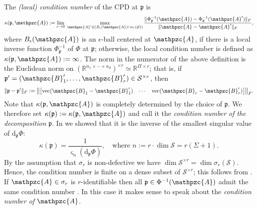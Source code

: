 \documentclass[a4paper,10pt,final]{siamart1116}
\newcommand{\tuple}[1]{\mathfrak{#1}}
\newcommand{\Var}[1]{\mathcal{#1}}
\newcommand{\tensor}[1]{\mathpzc{#1}}
\newcommand{\deriv}[2]{\mathrm{d}_{#1}#2}
\newcommand{\R}{\mathbb{R}}
\numberwithin{equation}{section}
\numberwithin{figure}{section}
\numberwithin{table}{section}
\numberwithin{theorem}{section}
\begin{document}
The \emph{(local) condition number} \cite{BC2013,Higham1996} of the CPD at $\tuple{p}$ is
\begin{equation*}
\kappa (\tuple{p}, \tensor{A}) := \lim_{\epsilon \to 0} \; \max_{\tensor{A}' \in (B_{\epsilon}(\tensor{A}) \cap \sigma_r(\Var{S}))} \frac{\| \Phi_{\tuple{p}}^{-1}(\tensor{A}) - \Phi_{\tuple{p}}^{-1}(\tensor{A}') \|_F}{\| \tensor{A} - \tensor{A}' \|_F},
\end{equation*}
where $B_\epsilon(\tensor{A})$ is an $\epsilon$-ball centered at $\tensor{A}$, if there is a local inverse function $\Phi_{\tuple{p}}^{-1}$ of $\Phi$ at $\tuple{p}$; otherwise, the local condition number is defined as $\kappa (\tuple{p}, \tensor{A}):=\infty$. The norm in the numerator of the above definition is the Euclidean norm on $(\R^{n_1 \times \cdots \times n_d})^{\times r} \simeq \R^{\Pi \times r}$; that is, if $\tuple{p}' =(\tensor{B}_1',\ldots,\tensor{B}_r') \in \Var{S}^{\times r}$, then
\[
 \| \tuple{p} - \tuple{p}' \|_{F} := \bigl\| \begin{bmatrix} \operatorname{vec}(\tensor{B}_1 - \tensor{B}_1') & \cdots & \operatorname{vec}(\tensor{B}_r - \tensor{B}_r') \end{bmatrix} \bigr\|_F.
\]%
Note that $\kappa (\tuple{p}, \tensor{A})$ is completely determined by the choice of $\tuple{p}$. We therefore set $\kappa(\tuple{p}):=\kappa (\tuple{p}, \tensor{A})$ and call it the \emph{condition number of the decomposition $\tuple{p}$}.
In \cite{BV2017} we showed that it is the inverse of the smallest singular value of $\deriv{\tuple{p}}{\Phi}$:
\begin{equation}\label{kappa}
\kappa(\tuple{p})=\frac{1}{\varsigma_{n}(\deriv{\tuple{p}}{\Phi})}, {\quad\text{where } n := r \cdot \dim \Var{S} = r (\Sigma+1).}
\end{equation}
By the assumption that $\sigma_r$ is non-defective we have $\dim \Var S^{\times r} = \dim \sigma_r(\Var S)$. Hence, the condition number is finite on a dense subset of $\Var S^{\times r}$; this follows from \cite[proof of Theorem 1.1]{BV2017}. If $\tensor{A}\in\sigma_r$ is $r$-identifiable then all $\tuple{p}\in\Phi^{-1}(\tensor{A})$ admit the same condition number \cite{BV2017}. In this case it makes sense to speak about the \emph{condition number of $\tensor{A}$}.
\end{document}
